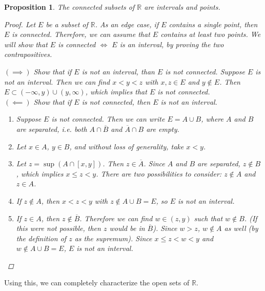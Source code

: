 \documentclass[12pt]{amsart}         %
\newtheorem{proposition}{Proposition}[section]
\theoremstyle{remark}
\newcommand{\R}{\mathbb{R}}
\begin{document}
\begin{proposition}
The connected subsets of $\R$ are intervals and points.
\begin{proof}
Let $E$ be a subset of $\R$. As an edge case, if $E$ contains a single point, then $E$ is connected. Therefore, we can assume that $E$ contains at least two points. We will show that $E$ is connected $\iff$ $E$ is an interval, by proving the two contrapositives.

\indent $(\implies)$ Show that if $E$ is not an interval, than $E$ is not connected. Suppose $E$ is not an interval. Then we can find $x < y < z$ with $x, z \in E$ and $y \notin E$. Then $E \subset (-\infty, y)\cup(y,\infty)$, which implies that $E$ is not connected.\\

\indent $(\impliedby)$ Show that if $E$ is not connected, then $E$ is not an interval.
\begin{enumerate}    
    \item Suppose $E$ is not connected. Then we can write $E = A \cup B$, where $A$ and $B$ are separated, i.e. both $A \cap \overline{B}$ and $\overline{A}\cap B$ are empty.
    \item Let $x \in A$, $y \in B$, and without loss of generality, take $x < y$. 
    \item Let $z = \sup \left(A \cap [x, y]\right)$. Then $z \in \overline{A}$. Since $A$ and $B$ are separated, $z \notin B$, which implies $x \leq z < y$. There are two possibilities to consider: $z \notin A$ and $z \in A$.
    \item If $z \notin A$, then $x < z < y$ with $z \notin A\cup B = E$, so $E$ is not an interval.
    \item If $z \in A$, then $z \notin \overline{B}$. Therefore we can find $w \in (z, y)$ such that $w \notin B$. (If this were not possible, then $z$ would be in $\overline{B}$). Since $w > z$, $w \notin A$ as well (by the definition of $z$ as the supremum). Since $x \leq z < w < y$ and $w \notin A\cup B = E$, $E$ is not an interval.
\end{enumerate}
\end{proof}
\end{proposition}

Using this, we can completely characterize the open sets of $\R$.
\end{document}

